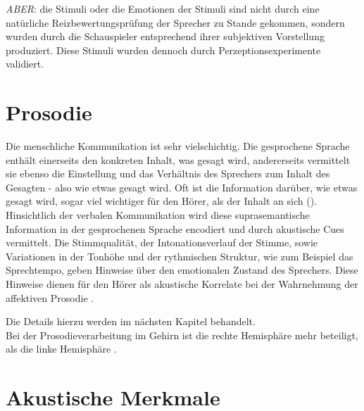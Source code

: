 \documentclass[11pt,a4paper,headsepline,twoside,toc=bibliography]{scrreprt}
\begin{document}
\emph{ABER}: die Stimuli oder die Emotionen der Stimuli sind nicht durch eine natürliche Reizbewertungsprüfung der Sprecher zu Stande gekommen, sondern wurden durch die Schauspieler entsprechend ihrer subjektiven Vorstellung produziert. Diese Stimuli wurden dennoch durch Perzeptionsexperimente validiert.\\



\section{Prosodie}
\label{sec:prosody}

Die menschliche Kommunikation ist sehr vielschichtig. Die gesprochene Sprache enthält einerseits den konkreten Inhalt, was gesagt wird, andererseits vermittelt sie ebenso die Einstellung und das Verhältnis des Sprechers zum Inhalt des Gesagten - also wie etwas gesagt wird. Oft ist die Information darüber, wie etwas gesagt wird, sogar viel wichtiger für den Hörer, als der Inhalt an sich (\textcite{Wildgruber2006}). Hinsichtlich der verbalen Kommunikation wird diese suprasemantische Information in der gesprochenen Sprache encodiert und durch akustische Cues vermittelt. Die Stimmqualität, der Intonationsverlauf der Stimme, sowie Variationen in der Tonhöhe und der rythmischen Struktur, wie zum Beispiel das Sprechtempo, geben Hinweise über den emotionalen Zustand des Sprechers. Diese Hinweise dienen für den Hörer als akustische Korrelate bei der Wahrnehmung der affektiven Prosodie . 

Die Details hierzu werden im nächsten Kapitel behandelt. \\  

Bei der Prosodieverarbeitung im Gehirn ist die rechte Hemisphäre mehr beteiligt, als die linke Hemisphäre \parencite{Ackermann2014c} .  

\section{Akustische Merkmale}
\label{sec:prosody_features}
\end{document}
